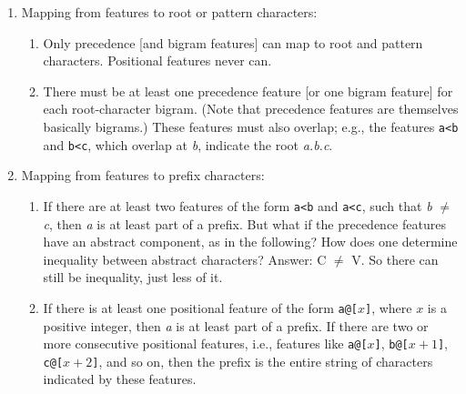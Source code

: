 \begin{enumerate}
  \item Mapping from features to root or pattern characters:
    \begin{enumerate}
   	\item Only precedence [and bigram features] can map to root and pattern characters. Positional features never can.
   	\item There must be at least one precedence feature [or one bigram feature] for each root-character bigram. (Note that precedence features are themselves basically bigrams.) These features must also overlap; e.g., the features \texttt{a<b} and \texttt{b<c}, which overlap at \textit{b}, indicate the root \textit{a.b.c}. %
     \end{enumerate}

   \item Mapping from features to prefix characters:
   \begin{enumerate}
       \item If there are at least two features of the form \texttt{a<b} and \texttt{a<c}, such that \textit{b} $\ne$ \textit{c}, then \textit{a} is at least part of a prefix. But what if the precedence features have an abstract component, as in the following?
       How does one determine inequality between abstract characters? Answer: C $\ne$ V. So there can still be inequality, just less of it. 
       \item If there is at least one positional feature of the form \texttt{a@[}$x$\texttt{]}, where $x$ is a positive integer, then \textit{a} is at least part of a prefix. If there are two or more consecutive positional features, i.e., features like \texttt{a@[}$x$\texttt{]}, \texttt{b@[}$x+1$\texttt{]}, \texttt{c@[}$x+2$\texttt{]}, and so on, then the prefix is the entire string of characters indicated by these features.
    \end{enumerate}


\end{enumerate}

